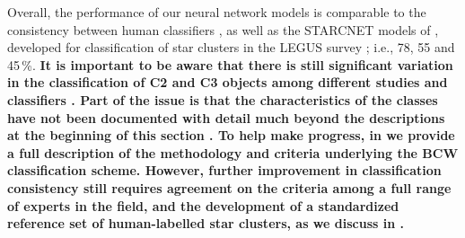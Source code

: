 \documentclass[linenumbers]{aastex63}
\begin{document}
Overall, the performance of our neural network models is comparable to the consistency between human classifiers \citep{wei_deep_2020, whitmore_star_2021}, as well as the \textsc{STARCNET} models of \citet{perez_starcnet_2021}, developed for classification of star clusters in the LEGUS survey \citep{calzetti_legacy_2015, linden_star_2022}; i.e., 78, 55 and 45\,\%.    \textbf{It is important to be aware that there is still significant variation in the classification of C2 and C3 objects among different studies and classifiers \citep[e.g., discussion in section 6.3.3 of][]{whitmore_star_2021}.  Part of the issue is that the characteristics of the classes have not been documented with detail much beyond the descriptions at the beginning of this section \citep[e.g., see section 2 in both][]{adamo_legacy_2017, perez_starcnet_2021}.  To help make progress, in \citet{whitmore_star_2021} we provide a full description of the methodology and criteria underlying the BCW classification scheme.  However, further improvement in classification consistency still requires agreement on the criteria among a full range of experts in the field, and the development of a standardized reference set of human-labelled star clusters, as we discuss in \citet{wei_deep_2020}.}   


\end{document}
